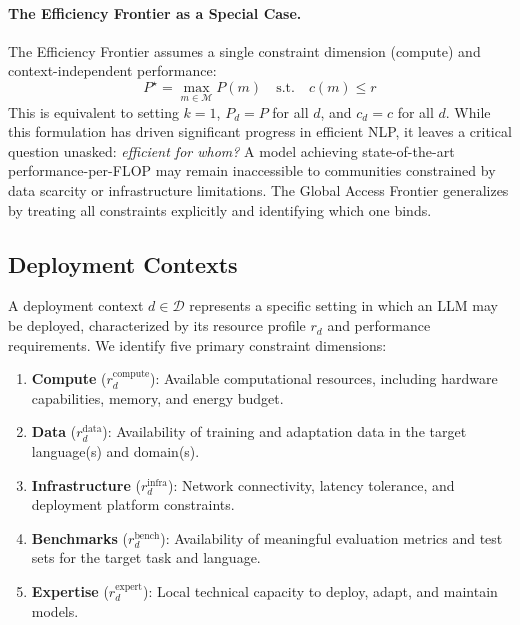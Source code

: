 \paragraph{The Efficiency Frontier as a Special Case.} The Efficiency Frontier assumes a single constraint dimension (compute) and context-independent performance:
\begin{equation}
    P^\star = \max_{m \in \mathcal{M}} P(m) \quad \text{s.t.} \quad c(m) \leq r
    \label{eq:efficiency-frontier}
\end{equation}
This is equivalent to setting $k = 1$, $P_d = P$ for all $d$, and $c_d = c$ for all $d$. While this formulation has driven significant progress in efficient NLP, it leaves a critical question unasked: \emph{efficient for whom?} A model achieving state-of-the-art performance-per-FLOP may remain inaccessible to communities constrained by data scarcity or infrastructure limitations. The Global Access Frontier generalizes by treating all constraints explicitly and identifying which one binds.

\subsection{Deployment Contexts}

A deployment context $d \in \mathcal{D}$ represents a specific setting in which an LLM may be deployed, characterized by its resource profile $r_d$ and performance requirements. We identify five primary constraint dimensions:

\begin{enumerate}
    \item \textbf{Compute} ($r_d^{\text{compute}}$): Available computational resources, including hardware capabilities, memory, and energy budget.
    \item \textbf{Data} ($r_d^{\text{data}}$): Availability of training and adaptation data in the target language(s) and domain(s).
    \item \textbf{Infrastructure} ($r_d^{\text{infra}}$): Network connectivity, latency tolerance, and deployment platform constraints.
    \item \textbf{Benchmarks} ($r_d^{\text{bench}}$): Availability of meaningful evaluation metrics and test sets for the target task and language.
    \item \textbf{Expertise} ($r_d^{\text{expert}}$): Local technical capacity to deploy, adapt, and maintain models.
\end{enumerate}

